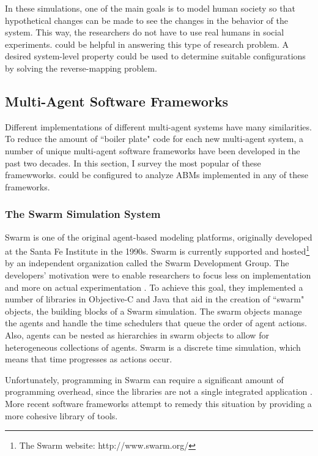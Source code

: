 In these simulations, one of the main goals is to model human society so that hypothetical changes can be made to see the changes in the behavior of the system.
This way, the researchers do not have to use real humans in social experiments.
\fw could be helpful in answering this type of research problem.
A desired system-level property could be used to determine suitable configurations by solving the reverse-mapping problem.



\subsection{Multi-Agent Software Frameworks}
Different implementations of different multi-agent systems have many similarities.
To reduce the amount of ``boiler plate" code for each new multi-agent system, a number of unique multi-agent software frameworks have been developed in the past two decades.
In this section, I survey the most popular of these framewworks.
\fw could be configured to analyze ABMs implemented in any of these frameworks.

\subsubsection{The Swarm Simulation System}
Swarm is one of the original agent-based modeling platforms, originally developed at the Santa Fe Institute in the 1990s.
Swarm is currently supported and hosted\footnote{The Swarm website: http://www.swarm.org/} by an independent organization called the Swarm Development Group.
The developers' motivation were to enable researchers to focus less on implementation and more on actual experimentation \cite{minar1996swarm}.
To achieve this goal, they implemented a number of libraries in Objective-C and Java that aid in the creation of ``swarm" objects, the building blocks of a Swarm simulation.
The swarm objects manage the agents and handle the time schedulers that queue the order of agent actions.
Also, agents can be nested as hierarchies in swarm objects to allow for heterogeneous collections of agents.
Swarm is a discrete time simulation, which means that time progresses as actions occur.

Unfortunately, programming in Swarm can require a significant amount of programming overhead, since the libraries are not a single integrated application \cite{kleinbreve}.
More recent software frameworks attempt to remedy this situation by providing a more cohesive library of tools.


